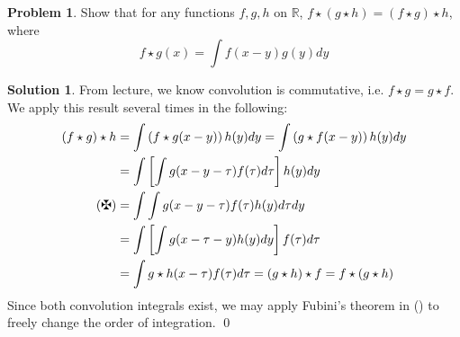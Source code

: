 \documentclass[10pt]{article}
\theoremstyle{plain}
\theoremstyle{definition}
\newtheorem{prob}{Problem}
\newtheorem*{soln*}{Solution}
\providecommand{\R}{\mathbb{R}}%
\numberwithin{equation}{section}
\begin{document}
\hrulefill

\begin{prob}
Show that for any functions $f,g,h$ on $\R$, $f\star (g \star h) = (f\star g) \star h$, where
\[
        f \star g(x) = \int f(x-y) g(y) dy
    \]
\end{prob}

\begin{soln*}
    From lecture, we know convolution is commutative, i.e. $f\star g = g \star f$.
    We apply this result several times in the following:
    \begin{align*}
        (f \star g ) \star h
        &= \int \left(f \star g(x-y)\right) h(y) dy = \int \left(g \star f(x-y)\right) h(y) dy \\
        &= \int \left[ \int g(x-y-\tau) f(\tau) d\tau \right] h(y) dy \\ \tag{\textbf{\maltese}}
        &= \int \int g(x-y-\tau) f(\tau) h(y) d\tau dy \\ 
        &= \int \left[ \int g(x-\tau-y) h(y) dy \right]f(\tau) d\tau  \\
        &= \int g\star h(x-\tau) f(\tau) d\tau = (g \star h) \star f = f \star (g \star h)
    \end{align*}
    Since both convolution integrals exist, we may apply Fubini's theorem in
    (\textbf{\maltese}) to freely change the order of integration.
    \qed
\end{soln*}

\hrulefill
\end{document}
